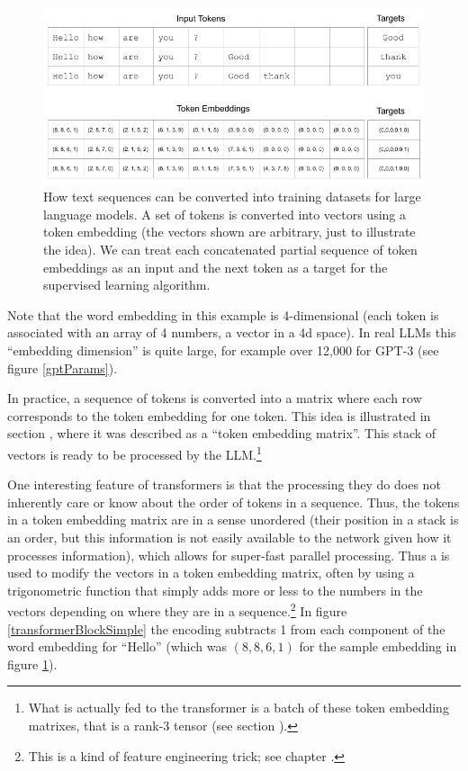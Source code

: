 \begin{figure}[h]
\centering
\includegraphics[scale=.45]{./images/contextWindow.png}
\caption[Jeff Yoshimi]{How text sequences can be converted into training datasets for large language models. A set of tokens is converted into vectors using a token embedding (the vectors shown are arbitrary, just to illustrate the idea). We can treat each concatenated partial sequence of token embeddings as an input and the next token as a target for the supervised learning algorithm. }
\label{nextWordPrediction}
\end{figure}

Note that the word embedding in this example is 4-dimensional (each token is associated with an array of 4 numbers, a vector in a 4d space). In real LLMs this ``embedding dimension'' is quite large, for example over 12,000 for GPT-3 (see figure \ref{gptParams}). 

In practice, a sequence of tokens is converted into a matrix where each row corresponds to the token embedding for one token. This idea is illustrated in section , where it was described as a ``token embedding matrix''. This stack of vectors is ready to be processed by the LLM.\footnote{What is actually fed to the transformer is  a batch of these token embedding matrixes, that is a rank-3 tensor (see section ).}

One interesting feature of transformers is that the processing they do does not inherently care or know about the order of tokens in a sequence. Thus, the tokens in a token embedding matrix are in a sense unordered (their position in a stack is an order, but this information is not easily available to the network given how it processes information), which allows for super-fast parallel processing. Thus a  is used to modify the vectors in a token embedding matrix, often by using a trigonometric function that simply adds more or less to the numbers in the vectors depending on where they are in a sequence.\footnote{This is a kind of feature engineering trick; see chapter .}  In figure \ref{transformerBlockSimple} the encoding subtracts 1 from each component of the word embedding for ``Hello'' (which was $(8,8,6,1)$ for the sample embedding in figure \ref{nextWordPrediction}).
  
